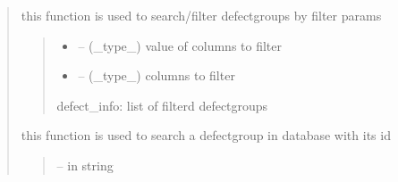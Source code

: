 \documentclass[letterpaper,10pt,english]{sphinxmanual}
\begin{document}
\begin{quote}
\begin{savenotes}
\begin{fulllineitems}
\begin{savenotes}
\begin{fulllineitems}
\end{fulllineitems}\end{savenotes}


\begin{savenotes}\begin{fulllineitems}
\label{\detokenize{setting/database_utils:oxin.database_utils.dataBaseUtils.search_defect_group_by_filter}}
\pysigstartsignatures
{}
\pysigstopsignatures
\sphinxAtStartPar
this function is used to search/filter defect\sphinxhyphen{}groups by filter params
\begin{quote}\begin{description}
\begin{itemize}
\item {} 
\sphinxAtStartPar
{} – (\_type\_) value of columns to filter

\item {} 
\sphinxAtStartPar
{} – (\_type\_) columns to filter

\end{itemize}

\sphinxAtStartPar
defect\_info: list of filterd defect\sphinxhyphen{}groups

\end{description}\end{quote}

\end{fulllineitems}\end{savenotes}


\begin{savenotes}\begin{fulllineitems}
\label{\detokenize{setting/database_utils:oxin.database_utils.dataBaseUtils.search_defect_group_by_id}}
\pysigstartsignatures
{}
\pysigstopsignatures
\sphinxAtStartPar
this function is used to search a defect\sphinxhyphen{}group in database with its id
\begin{quote}\begin{description}
\sphinxAtStartPar
{} – in string


\end{description}
\end{quote}
\end{fulllineitems}
\end{savenotes}
\end{fulllineitems}
\end{savenotes}
\end{quote}
\end{document}
